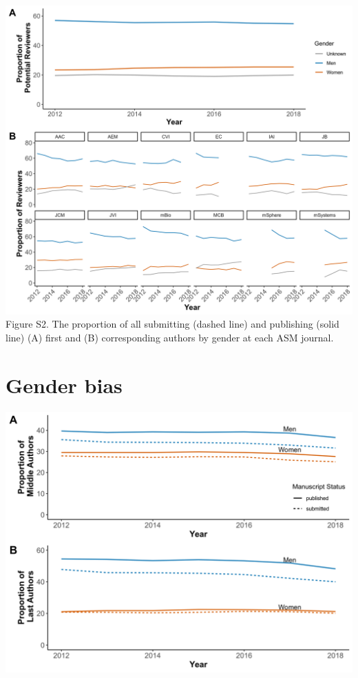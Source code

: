 \documentclass[11pt,]{article}
\begin{document}
\newpage

\includegraphics{Figure_S2.png} Figure S2. The proportion of all
submitting (dashed line) and publishing (solid line) (A) first and (B)
corresponding authors by gender at each ASM journal.

\newpage

\section{Gender bias}\label{gender-bias}

\includegraphics{Figure_S3.png}
\end{document}
